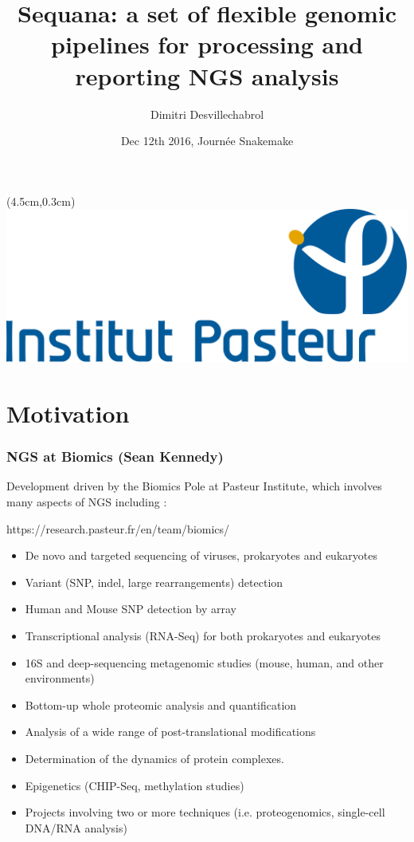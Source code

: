 \documentclass{beamer}
\title[Sequana]{Sequana: a set of flexible genomic pipelines for processing and reporting NGS analysis}
\author[D.Desvillechabrol]{Dimitri Desvillechabrol}
\institute{Institut Pasteur}
\date{Dec 12th 2016, Journée Snakemake}
\begin{document}

\begin{frame}[plain]
    \titlepage
    \begin{textblock*}{5cm}(4.5cm,0.3cm)
        \includegraphics[scale=0.09]{images/Institut_Pasteur.png}
    \end{textblock*}
\end{frame}


\section{Motivation}

\begin{frame}
    \frametitle{NGS at Biomics (Sean Kennedy)}
 
 Development driven by the Biomics Pole at Pasteur Institute, which involves
 many aspects of NGS including :
 
 \tiny
 \begin{block}{https://research.pasteur.fr/en/team/biomics/}
  \begin{itemize}
  \item De novo and targeted sequencing of viruses, prokaryotes and eukaryotes
  \item Variant (SNP, indel, large rearrangements) detection
  \item Human and Mouse SNP detection by array
  \item Transcriptional analysis (RNA-Seq) for both prokaryotes and eukaryotes
  \item 16S and deep-sequencing metagenomic studies (mouse, human, and other environments)
  \item Bottom-up whole proteomic analysis and quantification
  \item Analysis of a wide range of post-translational modifications
  \item Determination of the dynamics of protein complexes.
  \item Epigenetics (CHIP-Seq, methylation studies)
  \item Projects involving two or more techniques (i.e. proteogenomics, single-cell DNA/RNA analysis)
  \end{itemize}
 \end{block}
 \small 
\end{frame}
\end{document}
